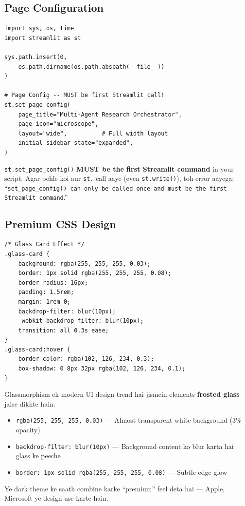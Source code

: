 \documentclass[12pt, a4paper]{article}
\begin{document}
\subsection{Page Configuration}

\begin{lstlisting}[style=pythonstyle, title={\color{accentgreen}\faIcon{file} app.py --- Page Config}]
import sys, os, time
import streamlit as st

sys.path.insert(0,
    os.path.dirname(os.path.abspath(__file__))
)

# Page Config -- MUST be first Streamlit call!
st.set_page_config(
    page_title="Multi-Agent Research Orchestrator",
    page_icon="microscope",
    layout="wide",          # Full width layout
    initial_sidebar_state="expanded",
)
\end{lstlisting}

\begin{warningbox}
\texttt{st.set\_page\_config()} \textbf{MUST be the first Streamlit command} in your script. Agar pehle koi aur \texttt{st.} call aaye (even \texttt{st.write()}), toh error aayega: ``\texttt{set\_page\_config() can only be called once and must be the first Streamlit command}.''
\end{warningbox}

\subsection{Premium CSS Design}

\begin{lstlisting}[style=cssstyle, title={\color{accentgreen}\faIcon{paint-brush} Glassmorphism CSS}]
/* Glass Card Effect */
.glass-card {
    background: rgba(255, 255, 255, 0.03);
    border: 1px solid rgba(255, 255, 255, 0.08);
    border-radius: 16px;
    padding: 1.5rem;
    margin: 1rem 0;
    backdrop-filter: blur(10px);
    -webkit-backdrop-filter: blur(10px);
    transition: all 0.3s ease;
}
.glass-card:hover {
    border-color: rgba(102, 126, 234, 0.3);
    box-shadow: 0 8px 32px rgba(102, 126, 234, 0.1);
}
\end{lstlisting}

\begin{conceptbox}[title={\faIcon{brain} ~Glassmorphism Kya Hai?}]
Glassmorphism ek modern UI design trend hai jismein elements \textbf{frosted glass} jaise dikhte hain:
\begin{itemize}
\item \texttt{rgba(255, 255, 255, 0.03)} --- Almost transparent white background (3\% opacity)
\item \texttt{backdrop-filter: blur(10px)} --- Background content ko blur karta hai glass ke peeche
\item \texttt{border: 1px solid rgba(255, 255, 255, 0.08)} --- Subtle edge glow
\end{itemize}
Ye dark theme ke saath combine karke ``premium'' feel deta hai --- Apple, Microsoft ye design use karte hain.
\end{conceptbox}
\end{document}
